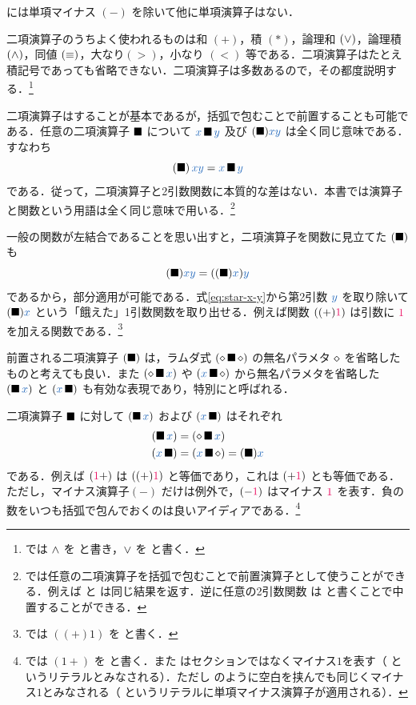 \documentclass[a5paper,twoside,fleqn,draft]{jsbook}
\begin{document}
\haskell には単項マイナス $(-)$ を除いて他に単項演算子はない．

\separator

二項演算子のうちよく使われるものは和 $(+)$，積 $(*)$，論理和 $(\operatorname{\vee})$，論理積 $(\operatorname{\wedge})$，同値 $(\operatorname{\equiv})$，大なり$(>)$，小なり $(<)$ 等である．二項演算子はたとえ積記号であっても省略できない．二項演算子は多数あるので，その都度説明する．\footnote{\haskell では $\operatorname{\wedge}$ を \code{\&\&} と書き，$\operatorname{\vee}$ を \code{||} と書く．}

二項演算子はすることが基本であるが，括弧で包むことで前置することも可能である．任意の二項演算子 $\operatorname{\blacksquare}$ について $\hVar{x}\hAnyBinOp\hVar{y}$ 及び $(\hAnyBinOp)\hVar{x}\hVar{y}$ は全く同じ意味である．すなわち
\begin{equation}
  \left(\hAnyBinOp\right)\hVar{x}\hVar{y}
  =\hVar{x}\hAnyBinOp\hVar{y}
\end{equation}
である．従って，二項演算子と2引数関数に本質的な差はない．本書では演算子と関数という用語は全く同じ意味で用いる．\footnote{\haskell では任意の二項演算子を括弧で包むことで前置演算子として使うことができる．例えば と  は同じ結果を返す．逆に任意の2引数関数 は  と書くことで中置することができる．}

一般の関数が左結合であることを思い出すと，二項演算子を関数に見立てた
$(\operatorname{\blacksquare})$ も
\begin{equation}
  \label{eq:star-x-y}
  (\hAnyBinOp)\hVar{x}\hVar{y}
  =((\hAnyBinOp)\hVar{x})\hVar{y}
\end{equation}
であるから，部分適用が可能である．式\eqref{eq:star-x-y}から第2引数 $\hVar{y}$ を取り除いて $(\hAnyBinOp)\hVar{x}$ という「餓えた」1引数関数を取り出せる．例えば関数 $((+)\hConstant{1})$ は引数に $\hConstant{1}$ を加える関数である．\footnote{\haskell では $((+)1)$ を  と書く．}

\separator

前置される二項演算子 $(\operatorname{\blacksquare})$ は，ラムダ式 $(\diamond\operatorname{\blacksquare}\diamond)$ の無名パラメタ $\diamond$ を省略したものと考えても良い．また $(\hAnonParam\hAnyBinOp\hVar{x})$ や $(\hVar{x}\hAnyBinOp\hAnonParam)$ から無名パラメタを省略した $(\hAnyBinOp\hVar{x})$ と $(\hVar{x}\hAnyBinOp)$ も有効な表現であり，特別にと呼ばれる．

二項演算子 $\operatorname{\blacksquare}$ に対して $(\hAnyBinOp\hVar{x})$ および $(\hVar{x}\hAnyBinOp)$ はそれぞれ
\begin{align}
  (\hAnyBinOp\hVar{x})
  &=(\hAnonParam\hAnyBinOp\hVar{x})\\
  (\hVar{x}\hAnyBinOp)
  &=(\hVar{x}\hAnyBinOp\hAnonParam)=(\hAnyBinOp)\hVar{x}
\end{align}
である．例えば $(\hConstant{1}+)$ は $((+)\hConstant{1})$ と等価であり，これは $(+\hConstant{1})$ とも等価である．ただし，マイナス演算子$(-)$ だけは例外で，$(-\hConstant{1})$ はマイナス $\hConstant{1}$ を表す．負の数をいつも括弧で包んでおくのは良いアイディアである．\footnote{\haskell では $(1+)$ を と書く．また  はセクションではなくマイナス$1$を表す（ というリテラルとみなされる）．ただし のように空白を挟んでも同じくマイナス$1$とみなされる（ というリテラルに単項マイナス演算子が適用される）．}
\end{document}
